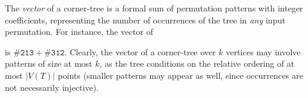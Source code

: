 \documentclass{article}
\newcommand{\pce}[1]{{\# \mathtt{#1} }}
\theoremstyle{remark}
\theoremstyle{plain}
\begin{document}
The \textit{vector} of a corner-tree is a formal sum of permutation patterns with integer coefficients, representing the number of occurrences of the tree in \textit{any} input permutation.
For instance, the vector of  is $\pce{213} + \pce{312}$. Clearly, the vector of a corner-tree over $k$ vertices may involve patterns of size at most $k$, as the tree conditions on the relative ordering of at most $|V(T)|$ points (smaller patterns may appear as well, since occurrences are not necessarily injective).
\end{document}
